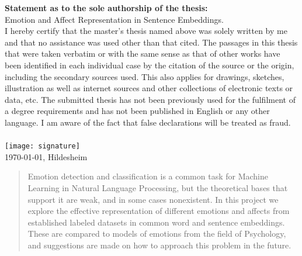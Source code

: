 \documentclass[a4paper,12pt]{report}
\begin{document}


\setcounter{secnumdepth}{1}


\noindent \textbf{Statement as to the sole authorship of the thesis:}
\vspace{0.4cm}
\\Emotion and Affect Representation in Sentence Embeddings.\\
I hereby certify that the master's thesis named above was solely written by me and that no assistance was used other than that cited. The passages in this thesis that were taken verbatim or with the same sense as that of other works have been identified in each individual case by the citation of the source or the origin, including the secondary sources used. This also applies for drawings, sketches, illustration as well as internet sources and other collections of electronic texts or data, etc. The submitted thesis has not been previously used for the fulfilment of a degree requirements and has not been published in English or any other language. I am aware of the fact that false declarations will be treated as fraud.\\

\vspace{5cm} \\

\texttt{[image: signature]}\\


\today, Hildesheim

\thispagestyle{empty}
\setcounter{tocdepth}{2}
\newpage

\begin{abstract}

Emotion detection and classification is a common task for Machine Learning in Natural Language Processing, but the theoretical bases that support it are weak, and in some cases nonexistent. In this project we explore the effective representation of different emotions and affects from established labeled datasets in common word and sentence embeddings. These are compared to models of emotions from the field of Psychology, and suggestions are made on how to approach this problem in the future.

\vfill
\end{abstract}
\end{document}
